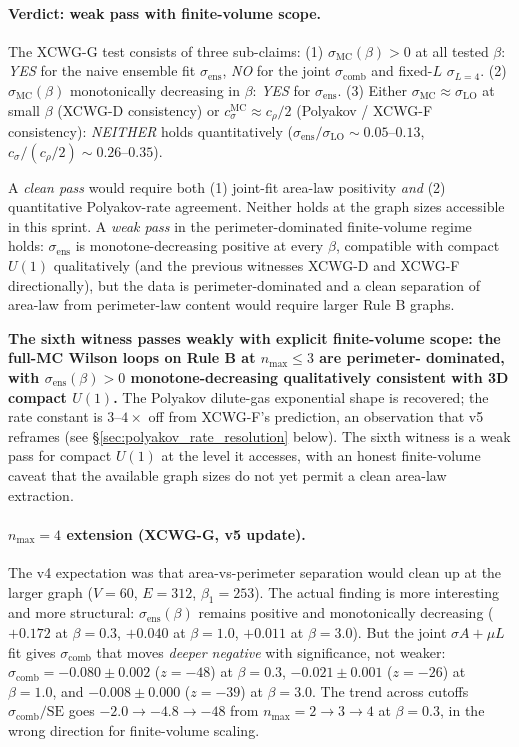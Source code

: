\documentclass[11pt]{article}
\begin{document}
\paragraph{Verdict: weak pass with finite-volume scope.} The XCWG-G test
consists of three sub-claims:
(1) $\sigma_\text{MC}(\beta)>0$ at all tested $\beta$: \emph{YES} for the
naive ensemble fit $\sigma_\text{ens}$, \emph{NO} for the joint
$\sigma_\text{comb}$ and fixed-$L$ $\sigma_{L=4}$.
(2) $\sigma_\text{MC}(\beta)$ monotonically decreasing in $\beta$: \emph{YES}
for $\sigma_\text{ens}$.
(3) Either $\sigma_\text{MC}\approx\sigma_\text{LO}$ at small $\beta$ (XCWG-D
consistency) or $c_\sigma^\text{MC}\approx c_\rho/2$ (Polyakov / XCWG-F
consistency): \emph{NEITHER} holds quantitatively
($\sigma_\text{ens}/\sigma_\text{LO}\sim 0.05$--$0.13$,
$c_\sigma/(c_\rho/2)\sim 0.26$--$0.35$).

A \emph{clean pass} would require both (1) joint-fit area-law positivity
\emph{and} (2) quantitative Polyakov-rate agreement. Neither holds at the
graph sizes accessible in this sprint. A \emph{weak pass} in the
perimeter-dominated finite-volume regime holds: $\sigma_\text{ens}$ is
monotone-decreasing positive at every $\beta$, compatible with compact
$U(1)$ qualitatively (and the previous witnesses
XCWG-D and XCWG-F directionally), but the data is perimeter-dominated and a
clean separation of area-law from perimeter-law content would require larger
Rule B graphs.

\textbf{The sixth witness passes weakly with explicit finite-volume scope:
the full-MC Wilson loops on Rule B at $n_\text{max}\le 3$ are perimeter-
dominated, with $\sigma_\text{ens}(\beta)>0$ monotone-decreasing
qualitatively consistent with 3D compact $U(1)$.} The Polyakov dilute-gas
exponential shape is recovered; the rate constant is $3$--$4\times$ off
from XCWG-F's prediction, an observation that v5 reframes (see
\S\ref{sec:polyakov_rate_resolution} below). The sixth witness is a weak
pass for compact $U(1)$ at the level it accesses, with an
honest finite-volume caveat that the available graph sizes do not yet permit a
clean area-law extraction.

\paragraph{$n_\text{max}=4$ extension (XCWG-G, v5 update).} The v4 expectation
was that area-vs-perimeter separation would clean up at the larger graph
($V=60$, $E=312$, $\beta_1=253$). The actual finding is more interesting and
more structural: $\sigma_\text{ens}(\beta)$ remains positive and monotonically
decreasing ($+0.172$ at $\beta=0.3$, $+0.040$ at $\beta=1.0$, $+0.011$ at
$\beta=3.0$). But the joint $\sigma A+\mu L$ fit gives $\sigma_\text{comb}$ that
moves \emph{deeper negative} with significance, not weaker:
$\sigma_\text{comb}=-0.080\pm 0.002$ ($z=-48$) at $\beta=0.3$,
$-0.021\pm 0.001$ ($z=-26$) at $\beta=1.0$, and $-0.008\pm 0.000$ ($z=-39$)
at $\beta=3.0$. The trend across cutoffs $\sigma_\text{comb}/\text{SE}$
goes $-2.0\to -4.8\to -48$ from $n_\text{max}=2\to 3\to 4$ at $\beta=0.3$, in
the wrong direction for finite-volume scaling.
\end{document}
